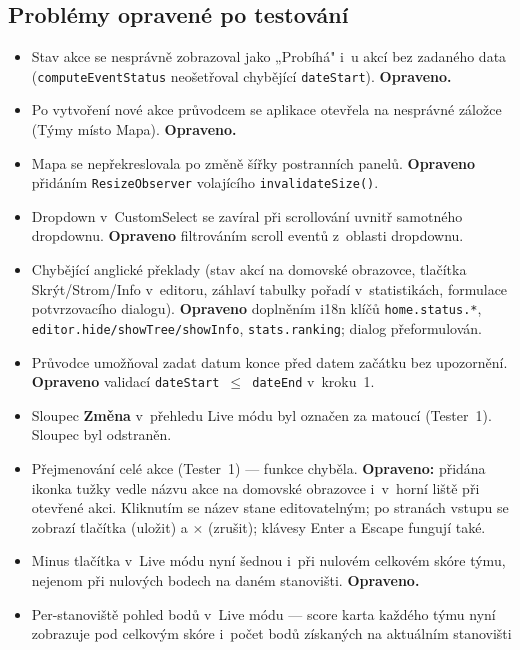 ﻿\documentclass[a4paper,12pt]{article}
\begin{document}
\subsection{Problémy opravené po testování}

\begin{itemize}
  \item Stav akce se nesprávně zobrazoval jako „Probíhá" i~u akcí bez
    zadaného data (\texttt{computeEventStatus} neošetřoval chybějící
    \texttt{dateStart}). \textbf{Opraveno.}
  \item Po vytvoření nové akce průvodcem se aplikace otevřela na nesprávné
    záložce (Týmy místo Mapa). \textbf{Opraveno.}
  \item Mapa se nepřekreslovala po změně šířky postranních panelů.
    \textbf{Opraveno} přidáním \texttt{ResizeObserver} volajícího
    \texttt{invalidateSize()}.
  \item Dropdown v~CustomSelect se zavíral při scrollování uvnitř samotného
    dropdownu. \textbf{Opraveno} filtrováním scroll eventů z~oblasti
    dropdownu.
  \item Chybějící anglické překlady (stav akcí na domovské obrazovce,
    tlačítka Skrýt/Strom/Info v~editoru, záhlaví tabulky pořadí v~statistikách,
    formulace potvrzovacího dialogu). \textbf{Opraveno} doplněním
    i18n klíčů \texttt{home.status.*}, \texttt{editor.hide/showTree/showInfo},
    \texttt{stats.ranking}; dialog přeformulován.
  \item Průvodce umožňoval zadat datum konce před datem začátku bez upozornění.
    \textbf{Opraveno} validací \texttt{dateStart $\leq$ dateEnd} v~kroku~1.
  \item Sloupec \textbf{Změna} v~přehledu Live módu byl označen za matoucí (Tester~1).
    Sloupec byl odstraněn.
  \item Přejmenování celé akce (Tester~1) — funkce chyběla.
    \textbf{Opraveno:} přidána ikonka tužky vedle názvu akce na domovské obrazovce
    i~v~horní liště při otevřené akci. Kliknutím se název stane editovatelným;
    po stranách vstupu se zobrazí tlačítka \checkmark{} (uložit) a $\times$ (zrušit);
    klávesy Enter a Escape fungují také.
  \item Minus tlačítka v~Live módu nyní šednou i~při nulovém celkovém skóre
    týmu, nejenom při nulových bodech na daném stanovišti. \textbf{Opraveno.}
  \item Per-stanoviště pohled bodů v~Live módu — score karta každého týmu nyní
    zobrazuje pod celkovým skóre i~počet bodů získaných na aktuálním stanovišti

\end{itemize}
\end{document}
